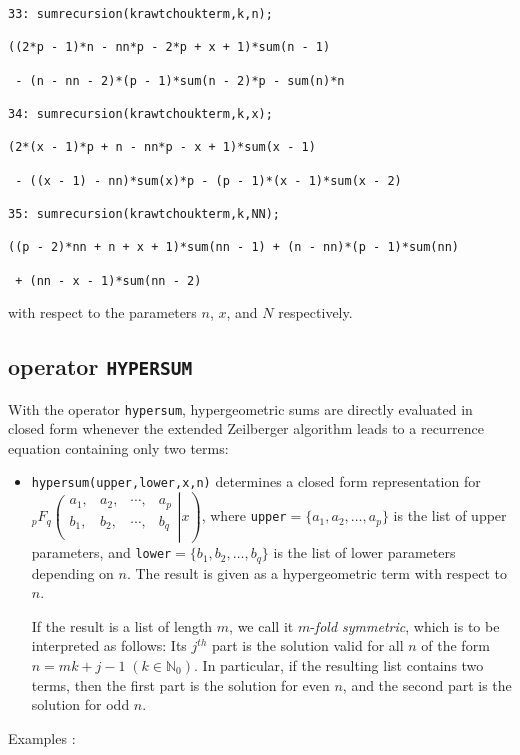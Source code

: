 {\small
\begin{verbatim}
33: sumrecursion(krawtchoukterm,k,n);

((2*p - 1)*n - nn*p - 2*p + x + 1)*sum(n - 1)

 - (n - nn - 2)*(p - 1)*sum(n - 2)*p - sum(n)*n

34: sumrecursion(krawtchoukterm,k,x);

(2*(x - 1)*p + n - nn*p - x + 1)*sum(x - 1)

 - ((x - 1) - nn)*sum(x)*p - (p - 1)*(x - 1)*sum(x - 2)

35: sumrecursion(krawtchoukterm,k,NN);

((p - 2)*nn + n + x + 1)*sum(nn - 1) + (n - nn)*(p - 1)*sum(nn)

 + (nn - x - 1)*sum(nn - 2)
\end{verbatim}
}\noindent
with respect to the parameters $n$, $x$, and $N$ respectively.

\subsection{\REDUCE{} operator {\tt HYPERSUM}}

With the operator {\tt hypersum}, hypergeometric sums are directly
evaluated in closed form whenever the extended 
Zeilberger algorithm leads to a recurrence equation containing only
two terms:
\begin{itemize}
\item
{\tt hypersum(upper,lower,x,n)} determines a closed form representation
for
$_{p}F_{q}\left.\left(\begin{array}{cccc}
a_{1},&a_{2},&\cdots,&a_{p}\\
b_{1},&b_{2},&\cdots,&b_{q}\\
            \end{array}\right| x\right)
$, where {\tt upper}$=\{a_{1}, a_{2}, \ldots, a_{p}\}$
is the list of upper parameters, and
{\tt lower}$=\{b_{1}, b_{2}, \ldots, b_{q}\}$
is the list of lower parameters depending on $n$. The result is given as a 
hypergeometric term with respect to $n$.  

If the result is a list of length $m$, we call it $m$-{\sl fold symmetric},
which is to be interpreted as follows:
Its $j^{th}$ part is the solution valid for all $n$ of the form $n=mk+j-1
\;(k\in\mathbb{N}_0)$.
In particular, if the resulting list contains two terms, then
the first part is the solution for even $n$, and the second part is the 
solution for odd $n$.
\end{itemize}
Examples \cite{Koepf}:

